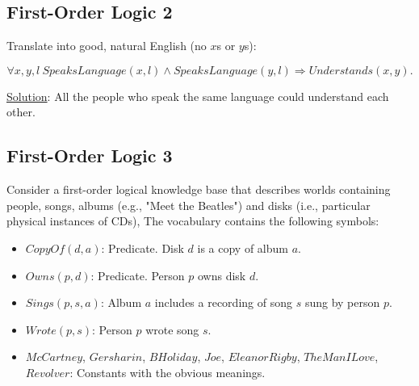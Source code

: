 \documentclass[11pt, answers]{exam}
\begin{document}
%
%
\begin{questions}
\section{First-Order Logic 2}
\question

Translate into good, natural English (no $x$s or $y$s):

$$\forall x,y,l\ SpeaksLanguage(x,l)\wedge SpeaksLanguage(y,l)\Rightarrow Understands(x,y).$$

\underline{Solution}: All the people who speak the same language could understand each other.
\end{questions}


%
%
\begin{questions}
\section{First-Order Logic 3}
\question

Consider a first-order logical knowledge base that describes worlds containing people, songs, albums (e.g., "Meet the Beatles") and disks (i.e., particular physical instances of CDs), The vocabulary contains the following symbols:
\begin{itemize}
	\item $CopyOf(d,a)$: Predicate. Disk $d$ is a copy of album $a$.
	\item $Owns(p, d)$: Predicate. Person $p$ owns disk $d$.
	\item $Sings(p, s, a)$: Album $a$ includes a recording of song $s$ sung by person $p$. 
	\item $Wrote(p, s)$: Person $p$ wrote song $s$.
	\item $McCartney$, $Gersharin$, $BHoliday$, $Joe$, $EleanorRigby$, $TheManILove$, $Revolver$: Constants with the obvious meanings.
\end{itemize}


\end{questions}
\end{document}
